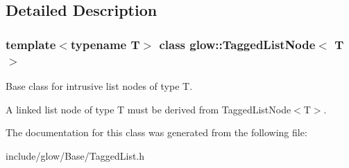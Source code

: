 \subsection{Detailed Description}
\subsubsection*{template$<$typename T$>$\newline
class glow\+::\+Tagged\+List\+Node$<$ T $>$}

Base class for intrusive list nodes of type T.

A linked list node of type T must be derived from Tagged\+List\+Node$<$\+T$>$. 

The documentation for this class was generated from the following file\+:\begin{DoxyCompactItemize}
\item 
include/glow/\+Base/Tagged\+List.\+h\end{DoxyCompactItemize}

